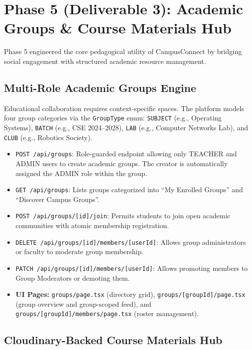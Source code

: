 \documentclass[11pt,a4paper]{report}
\begin{document}
\section{Phase 5 (Deliverable 3): Academic Groups \& Course Materials Hub}

Phase 5 engineered the core pedagogical utility of CampusConnect by bridging social engagement with structured academic resource management.

\subsection{Multi-Role Academic Groups Engine}

Educational collaboration requires context-specific spaces. The platform models four group categories via the \texttt{GroupType} enum: \texttt{SUBJECT} (e.g., Operating Systems), \texttt{BATCH} (e.g., CSE 2024--2028), \texttt{LAB} (e.g., Computer Networks Lab), and \texttt{CLUB} (e.g., Robotics Society).

\begin{itemize}
    \item \texttt{POST /api/groups}: Role-guarded endpoint allowing only TEACHER and ADMIN users to create academic groups. The creator is automatically assigned the ADMIN role within the group.
    \item \texttt{GET /api/groups}: Lists groups categorized into ``My Enrolled Groups'' and ``Discover Campus Groups''.
    \item \texttt{POST /api/groups/[id]/join}: Permits students to join open academic communities with atomic membership registration.
    \item \texttt{DELETE /api/groups/[id]/members/[userId]}: Allows group administrators or faculty to moderate group membership.
    \item \texttt{PATCH /api/groups/[id]/members/[userId]}: Allows promoting members to Group Moderators or demoting them.
    \item \textbf{UI Pages:} \texttt{groups/page.tsx} (directory grid), \texttt{groups/[groupId]/page.tsx} (group overview and group-scoped feed), and \texttt{groups/[groupId]/members/page.tsx} (roster management).
\end{itemize}

\subsection{Cloudinary-Backed Course Materials Hub}
\end{document}
